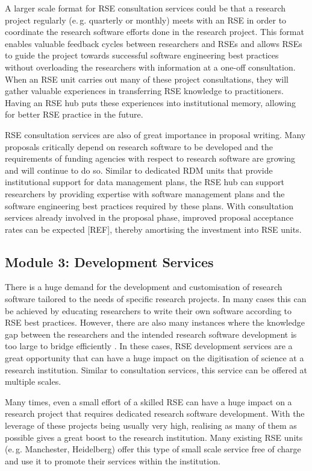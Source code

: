 \documentclass[a4paper]{article}
\makeatletter
\newcommand*{\eg}{e.\,g.\@\xspace}
\makeatother
\begin{document}
A larger scale format for RSE consultation services could be that a research project regularly (\eg{} quarterly or monthly) meets with an RSE in order to coordinate the research software efforts done in the research project.
This format enables valuable feedback cycles between researchers and RSEs and allows RSEs to guide the project
towards successful software engineering best practices without overloading the researchers with information at a one-off consultation.
When an RSE unit carries out many of these project consultations, they will gather valuable experiences in transferring RSE knowledge to practitioners.
Having an RSE hub puts these experiences into institutional memory, allowing for better RSE practice in the future.

RSE consultation services are also of great importance in proposal writing.
Many proposals critically depend on research software to be developed and the requirements of funding agencies with respect to research software are growing and will continue to do so.
Similar to dedicated RDM units that provide institutional support for data management plans,
the RSE hub can support researchers by providing expertise with software management plans and the software engineering best practices required by these plans.
With consultation services already involved in the proposal phase, improved proposal acceptance rates can be expected [REF], thereby amortising the investment into RSE units.


\subsection{Module 3: Development Services}%
\label{sec:development}

There is a huge demand for the development and customisation of research software tailored to the needs of specific research projects.
In many cases this can be achieved by educating researchers to write their own software according to RSE best practices.
However, there are also many instances where the knowledge gap between the researchers and the intended research software development is too large to bridge efficiently .
In these cases, RSE development services are a great opportunity that can have a huge impact on the digitisation of science at a research institution.
Similar to consultation services, this service can be offered at multiple scales.

Many times, even a small effort of a skilled RSE can have a huge impact on a research project that requires dedicated research software development.
With the leverage of these projects being usually very high, realising as many of them as possible gives a great boost to the research institution.
Many existing RSE units (\eg{} Manchester, Heidelberg) offer this type of small scale service free of charge and use it to promote their services within the institution.
\end{document}
